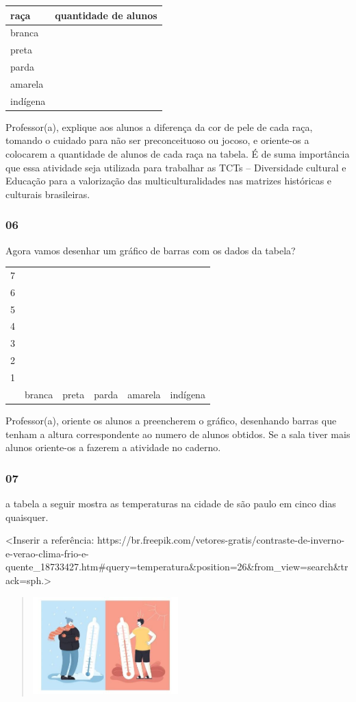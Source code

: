 \begin{longtable}[]{@{}ll@{}}
\toprule
raça & quantidade de alunos\tabularnewline
\midrule
\endhead
branca &\tabularnewline
preta &\tabularnewline
parda &\tabularnewline
amarela &\tabularnewline
indígena &\tabularnewline
\bottomrule
\end{longtable}

Professor(a), explique aos alunos a diferença da cor de pele de cada
raça, tomando o cuidado para não ser preconceituoso ou jocoso, e
oriente-os a colocarem a quantidade de alunos de cada raça na tabela. É
de suma importância que essa atividade seja utilizada para trabalhar as
TCTs -- Diversidade cultural e Educação para a valorização das
multiculturalidades nas matrizes históricas e culturais brasileiras.

\subsubsection{06}\label{section-81}

Agora vamos desenhar um gráfico de barras com os dados da tabela?

\begin{longtable}[]{@{}llllll@{}}
\toprule
7 & & & & &\tabularnewline
6 & & & & &\tabularnewline
5 & & & & &\tabularnewline
4 & & & & &\tabularnewline
3 & & & & &\tabularnewline
2 & & & & &\tabularnewline
1 & & & & &\tabularnewline
& branca & preta & parda & amarela & indígena\tabularnewline
\bottomrule
\end{longtable}

Professor(a), oriente os alunos a preencherem o gráfico, desenhando
barras que tenham a altura correspondente ao numero de alunos obtidos.
Se a sala tiver mais alunos oriente-os a fazerem a atividade no caderno.

\subsubsection{07}\label{section-82}

a tabela a seguir mostra as temperaturas na cidade de são paulo em cinco
dias quaisquer.

\textless{}Inserir a referência:
https://br.freepik.com/vetores-gratis/contraste-de-inverno-e-verao-clima-frio-e-quente\_18733427.htm\#query=temperatura\&position=26\&from\_view=search\&track=sph.\textgreater{}

\begin{quote}
\includegraphics[width=2.20878in,height=1.47139in]{media/image104.jpg}
\end{quote}

